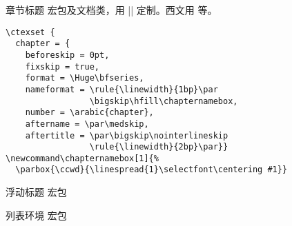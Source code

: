 \begin{frame}[fragile]{章节标题}
 宏包及文档类，用 |\ctexset| 定制。西文用  等。
\begin{Verbatim}
\ctexset {
  chapter = {
    beforeskip = 0pt,
    fixskip = true,
    format = \Huge\bfseries,
    nameformat = \rule{\linewidth}{1bp}\par
                 \bigskip\hfill\chapternamebox,
    number = \arabic{chapter},
    aftername = \par\medskip,
    aftertitle = \par\bigskip\nointerlineskip
                 \rule{\linewidth}{2bp}\par}}
\newcommand\chapternamebox[1]{%
  \parbox{\ccwd}{\linespread{1}\selectfont\centering #1}}
\end{Verbatim}
\end{frame}

\begin{frame}{浮动标题}
 宏包
\end{frame}

\begin{frame}{列表环境}
 宏包
\end{frame}
